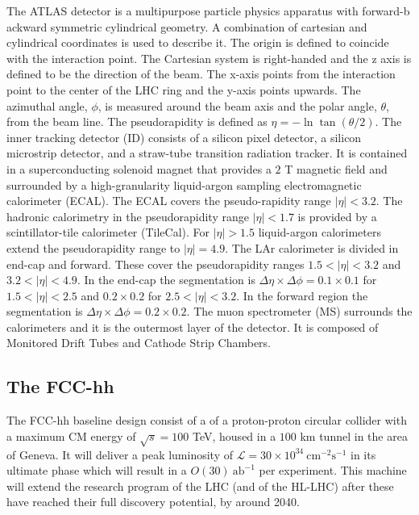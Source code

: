 The ATLAS detector is a multipurpose particle physics apparatus with forward-b ackward symmetric  cylindrical geometry. A combination of cartesian and cylindrical coordinates is used to describe it. The origin is defined to coincide with the interaction point. The Cartesian system is right-handed and the z axis is defined to be the direction of the beam. The x-axis points from the interaction point to the center of the LHC ring and the y-axis points upwards. The azimuthal angle, $\phi$, is measured around the beam axis and the polar angle, $\theta$, from the beam line. The pseudorapidity is defined as $\eta = − \ln \tan(\theta/2)$. The inner tracking detector (ID) consists of  a  silicon  pixel detector,  a  silicon  microstrip detector, and a straw-tube transition radiation tracker. It is contained in a superconducting solenoid magnet that provides a $2$ T magnetic field and surrounded by a high-granularity liquid-argon sampling electromagnetic calorimeter (ECAL). The ECAL covers the pseudo-rapidity range $|\eta|<3.2$. The hadronic calorimetry in the pseudorapidity range $|\eta| < 1.7$ is provided by a scintillator-tile calorimeter (TileCal). For $|\eta|>1.5$ liquid-argon calorimeters extend the pseudorapidity range to $|\eta|=4.9$. The LAr calorimeter is divided in end-cap and forward. These cover the pseudorapidity ranges $1.5 < |\eta| < 3.2$ and $3.2 < |\eta| <
4.9$. In the end-cap the segmentation is $\Delta\eta\times\Delta\phi = 0.1 \times 0.1$ for $1.5 < |\eta| < 2.5$ and $0.2 \times 0.2$ for $2.5 < |\eta| < 3.2$. In the forward region the segmentation is $\Delta\eta\times\Delta\phi = 0.2 \times 0.2$. The muon spectrometer (MS) surrounds the calorimeters and it is the outermost layer of the detector. It is composed of Monitored Drift Tubes and Cathode Strip Chambers.

\subsection{The FCC-hh}

The FCC-hh baseline design consist of a of a proton-proton circular collider with a maximum CM energy of $\sqrt{s}=100$ TeV, housed in a $100$ km tunnel in the area of Geneva. It will deliver a peak luminosity of $\mathcal{L}=30\times 10^{34}~\text{cm}^{-2}\text{s}^{-1}$ in its ultimate phase which will result in a $O(30)~\text{ab}^{-1}$ per experiment. This machine will extend the research program of the LHC (and of the HL-LHC) after these have reached their full discovery potential, by around 2040.

